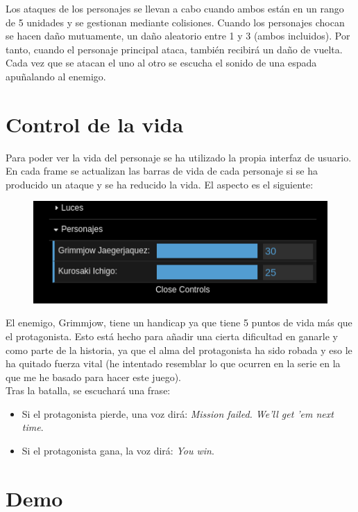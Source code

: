 \documentclass[11pt,a4paper]{article}
\begin{document}
Los ataques de los personajes se llevan a cabo cuando ambos están en un rango de 5 unidades y se gestionan mediante colisiones. Cuando los personajes chocan se hacen daño mutuamente, un daño aleatorio entre 1 y 3 (ambos incluidos). Por tanto, cuando el personaje principal ataca, también recibirá un daño de vuelta. Cada vez que se atacan el uno al otro se escucha el sonido de una espada apuñalando al enemigo.

\section{Control de la vida}

Para poder ver la vida del personaje se ha utilizado la propia interfaz de usuario. En cada frame se actualizan las barras de vida de cada personaje si se ha producido un ataque y se ha reducido la vida. El aspecto es el siguiente:

\begin{figure}[H]
	\centering
	\includegraphics[scale=0.5]{img/barravida.png}
\end{figure}

El enemigo, Grimmjow, tiene un handicap ya que tiene 5 puntos de vida más que el protagonista. Esto está hecho para añadir una cierta dificultad en ganarle y como parte de la historia, ya que el alma del protagonista ha sido robada y eso le ha quitado fuerza vital (he intentado resemblar lo que ocurren en la serie en la que me he basado para hacer este juego).\\

Tras la batalla, se escuchará una frase:

\begin{itemize}
	\item Si el protagonista pierde, una voz dirá: \textit{Mission failed. We'll get 'em next time}.
	\item Si el protagonista gana, la voz dirá: \textit{You win}.
\end{itemize}

\section{Demo}
\end{document}
